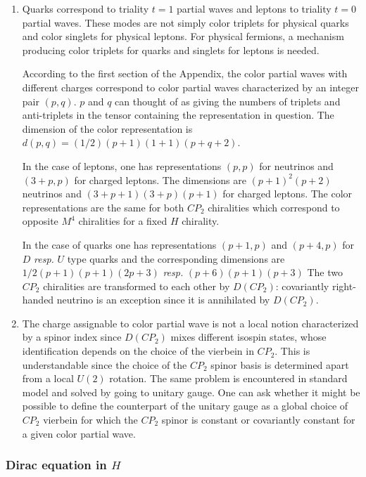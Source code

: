 \documentclass[10pt,epsf]{article}
\begin{document}
\begin{enumerate}
\item Quarks correspond to triality $t=1$ partial waves  and leptons to triality $t=0$ partial waves. These modes  are not simply color triplets for physical quarks and color singlets for physical leptons. For physical fermions, a mechanism  producing color triplets for quarks and singlets for leptons is needed. 

According to the first section of the Appendix,   the  color partial waves with different charges correspond to color partial waves characterized by an integer pair $(p,q)$. $p$ and $q$ can thought of as giving  the numbers of triplets and anti-triplets  in the tensor containing the representation in question. The dimension  of the color representation is  $d(p,q)= (1/2)(p+1)(1+1)(p+q+2)$.

 In the case of leptons, one has representations $(p,p)$ for neutrinos and $(3+p,p)$ for charged leptons. The dimensions are $(p+1)^2(p+2)$ neutrinos and $(3+p+1)(3+p)(p+1)$ for charged leptons. The color representations are the same for both $CP_2$ chiralities which correspond to opposite $M^4$ chiralities for a fixed $H$ chirality.

In the case of quarks one has representations $(p+1,p)$ and $(p+4,p)$ for $D$  {\it resp.}  $U$ type quarks  and the  corresponding dimensions are $1/2(p+1)(p+1)(2p+3)$ {\it resp.} $(p+6)(p+1)(p+3)$   The two $CP_2$ chiralities are transformed to each other by   $D(CP_2)$: covariantly right-handed neutrino is an  exception since it is annihilated by $D(CP_2)$. 


\item The charge assignable to  color partial wave is not a local notion characterized by a spinor index since $D(CP_2)$ mixes different isospin states,  whose identification depends on the choice of the vierbein in $CP_2$. This is understandable since the choice of the $CP_2$ spinor basis is determined apart from a local   $U(2)$ rotation. The same problem is encountered in standard model and solved by going to unitary gauge. One can ask whether it might be possible to define the counterpart of the unitary gauge as a global choice of $CP_2$ vierbein for which the $CP_2$ spinor  is constant  or covariantly constant for a given  color partial wave. 

\end{enumerate}

\subsubsection{Dirac equation in $H$}
\end{document}
